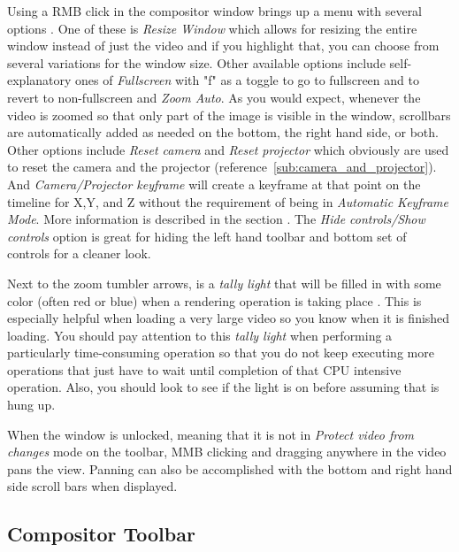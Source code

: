 Using a RMB click in the compositor window brings up a menu with several options .  One of these
is \emph{Resize Window} which allows for resizing the entire window instead of just the video
and if you highlight that, you can choose from several variations for the window size. 
Other available options include self-explanatory ones of \emph{Fullscreen} with "f" as a toggle
to go to fullscreen and to revert to non-fullscreen and \emph{Zoom Auto}. 
As you would expect, whenever the video is zoomed so that only part of the image is visible
in the window, scrollbars are automatically added as needed on the bottom, the right hand 
side, or both.
Other options include \emph{Reset camera} and \emph{Reset projector} which obviously are used
to reset the camera and the projector (reference~\ref{sub:camera_and_projector}).  And
\emph{Camera/Projector keyframe} will create a keyframe at that point on the timeline for
X,Y, and Z without the requirement of being in \textit{Automatic Keyframe Mode}.  More 
information is described in the section .
The \emph{Hide controls/Show controls} option is great for hiding the left hand toolbar and
bottom set of controls for a cleaner look. 

Next to the zoom tumbler arrows, is a \textit{tally light} that will be filled in with some color
(often red or blue) when a rendering operation
is taking place . This is especially helpful when loading a very large video so you know
when it is finished loading.  You should pay attention to this \textit{tally light} when performing
a particularly time-consuming operation so that you do not keep executing more operations
that just have to wait until completion of that CPU intensive operation.  Also, you should look
to see if the light is on before assuming that \CGG{} is hung up.

When the window is unlocked, meaning that it is not in \textit{Protect video from changes} mode on the
toolbar, MMB clicking and dragging anywhere in the video pans the view.  Panning can also
be accomplished with the bottom and right hand side scroll bars when displayed.

\subsection{Compositor Toolbar}%
\label{sub:compositor_toolbar}

